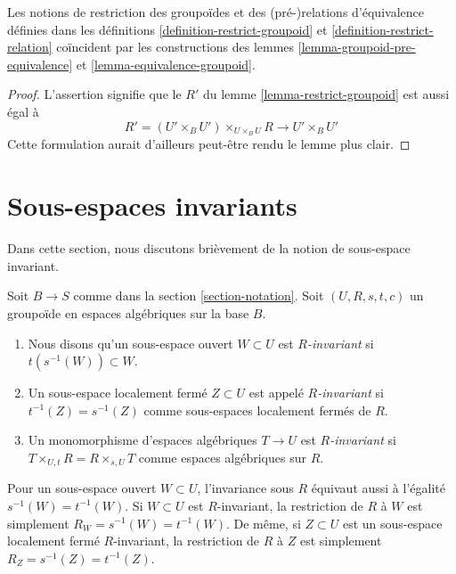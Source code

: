 \begin{lemma}
\label{lemma-restrict-groupoid-relation}
Les notions de restriction des groupoïdes et des (pré-)relations d'équivalence définies dans les définitions \ref{definition-restrict-groupoid} et \ref{definition-restrict-relation} coïncident par les constructions des lemmes \ref{lemma-groupoid-pre-equivalence} et \ref{lemma-equivalence-groupoid}.
\end{lemma}

\begin{proof}
L'assertion signifie que le $R'$ du lemme \ref{lemma-restrict-groupoid} est aussi égal à
$$
R' = (U' \times_B U')\times_{U \times_B U} R
\longrightarrow
U' \times_B U'
$$
Cette formulation aurait d'ailleurs peut-être rendu le lemme plus clair.
\end{proof}





\section{Sous-espaces invariants}
\label{section-invariant}

\noindent
Dans cette section, nous discutons brièvement de la notion de sous-espace invariant.

\begin{definition}
\label{definition-invariant-open}
Soit $B \to S$ comme dans la section \ref{section-notation}. Soit $(U, R, s, t, c)$ un groupoïde en espaces algébriques sur la base $B$.
\begin{enumerate}
\item Nous disons qu'un sous-espace ouvert $W \subset U$ est {\it $R$-invariant} si $t(s^{-1}(W)) \subset W$.
\item Un sous-espace localement fermé $Z \subset U$ est appelé {\it $R$-invariant} si $t^{-1}(Z) = s^{-1}(Z)$ comme sous-espaces localement fermés de $R$.
\item Un monomorphisme d'espaces algébriques $T \to U$ est {\it $R$-invariant} si $T \times_{U, t} R = R \times_{s, U} T$ comme espaces algébriques sur $R$.
\end{enumerate}
\end{definition}

\noindent
Pour un sous-espace ouvert $W \subset U$, l'invariance sous $R$ équivaut aussi à l'égalité $s^{-1}(W) = t^{-1}(W)$. Si $W \subset U$ est $R$-invariant, la restriction de $R$ à $W$ est simplement $R_W = s^{-1}(W) = t^{-1}(W)$. De même, si $Z \subset U$ est un sous-espace localement fermé $R$-invariant, la restriction de $R$ à $Z$ est simplement $R_Z = s^{-1}(Z) = t^{-1}(Z)$.

